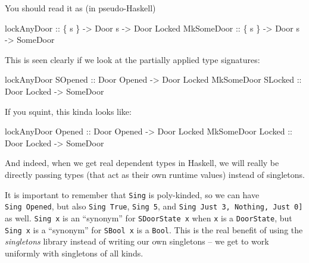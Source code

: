 \documentclass[]{article}
\newenvironment{Shaded}{}{}
\newcommand{\DataTypeTok}[1]{\textcolor[rgb]{0.56,0.13,0.00}{#1}}
\newcommand{\NormalTok}[1]{#1}
\newcommand{\OtherTok}[1]{\textcolor[rgb]{0.00,0.44,0.13}{#1}}
\begin{document}
You should read it as (in pseudo-Haskell)

\begin{Shaded}
\begin{Highlighting}[]
\OtherTok{lockAnyDoor ::}\NormalTok{ \{ s \} }\OtherTok{{-}>} \DataTypeTok{Door}\NormalTok{ s }\OtherTok{{-}>} \DataTypeTok{Door} \DataTypeTok{\textquotesingle{}Locked}
\DataTypeTok{MkSomeDoor}\OtherTok{  ::}\NormalTok{ \{ s \} }\OtherTok{{-}>} \DataTypeTok{Door}\NormalTok{ s }\OtherTok{{-}>} \DataTypeTok{SomeDoor}
\end{Highlighting}
\end{Shaded}

This is seen clearly if we look at the partially applied type signatures:

\begin{Shaded}
\begin{Highlighting}[]
\NormalTok{lockAnyDoor }\DataTypeTok{SOpened}\OtherTok{ ::} \DataTypeTok{Door} \DataTypeTok{\textquotesingle{}Opened} \OtherTok{{-}>} \DataTypeTok{Door} \DataTypeTok{\textquotesingle{}Locked}
\DataTypeTok{MkSomeDoor}  \DataTypeTok{SLocked}\OtherTok{ ::} \DataTypeTok{Door} \DataTypeTok{\textquotesingle{}Locked} \OtherTok{{-}>} \DataTypeTok{SomeDoor}
\end{Highlighting}
\end{Shaded}

If you squint, this kinda looks like:

\begin{Shaded}
\begin{Highlighting}[]
\NormalTok{lockAnyDoor }\DataTypeTok{\textquotesingle{}Opened}\OtherTok{ ::} \DataTypeTok{Door} \DataTypeTok{\textquotesingle{}Opened} \OtherTok{{-}>} \DataTypeTok{Door} \DataTypeTok{\textquotesingle{}Locked}
\DataTypeTok{MkSomeDoor}  \DataTypeTok{\textquotesingle{}Locked}\OtherTok{ ::} \DataTypeTok{Door} \DataTypeTok{\textquotesingle{}Locked} \OtherTok{{-}>} \DataTypeTok{SomeDoor}
\end{Highlighting}
\end{Shaded}

And indeed, when we get real dependent types in Haskell, we will really be
directly passing types (that act as their own runtime values) instead of
singletons.

It is important to remember that \texttt{Sing} is poly-kinded, so we can have
\texttt{Sing\ \textquotesingle{}Opened}, but also
\texttt{Sing\ \textquotesingle{}True}, \texttt{Sing\ 5}, and
\texttt{Sing\ \textquotesingle{}{[}\textquotesingle{}Just\ 3,\ \textquotesingle{}Nothing,\ \textquotesingle{}Just\ 0{]}}
as well. \texttt{Sing\ x} is an ``synonym'' for \texttt{SDoorState\ x} when
\texttt{x} is a \texttt{DoorState}, but \texttt{Sing\ x} is a ``synonym'' for
\texttt{SBool\ x} is a \texttt{Bool}. This is the real benefit of using the
\emph{singletons} library instead of writing our own singletons -- we get to
work uniformly with singletons of all kinds.
\end{document}
